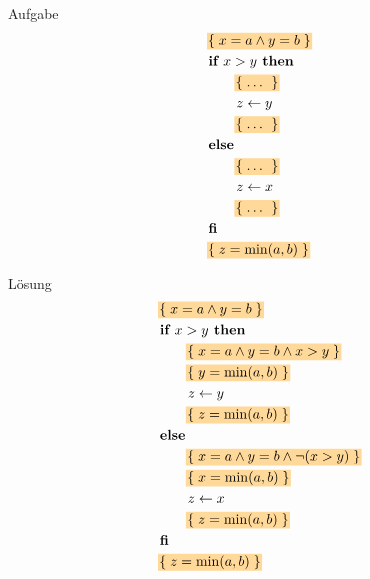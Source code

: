 \begin{frame}{Aufgabe}
	\vspace{-10mm}
	  \begin{align*}
	&\assert{x=a \land y=b}  \\
	&\kw{if } x>y \kw{ then } \\
	&\hspace{2em} \assert{ \dots\ } \\
	&\hspace{2em}  z \gets y  \\
	&\hspace{2em} \assert{ \dots\ } \\
	&\kw{else } \\
	&\hspace{2em} \assert{ \dots\ } \\
	&\hspace{2em}  z \gets x  \\
	&\hspace{2em} \assert{ \dots\ } \\
	&\kw{fi } \\
	&\assert{z=\min(a,b)}
	\end{align*}
\end{frame}

\begin{frame}{Lösung}	
	\vspace{-2.5\baselineskip}
	\begin{alignat*}{2}
	&\assert{x=a \land y=b}  \\
	&\kw{if } x>y \kw{ then } \\
	&\hspace{2em} \assert{x=a \land y=b \land x>y} \\
	&\hspace{2em} \assert{y=\min(a,b)} \\
	&\hspace{2em}  z \gets y  \\
	&\hspace{2em} \assert{z=\min(a,b)} \\
	&\kw{else } \\
	&\hspace{2em} \assert{x=a \land y=b \land  \lnot (x>y)} \\
	&\hspace{2em} \assert{x=\min(a,b)} \\
	&\hspace{2em}  z \gets x  \\
	&\hspace{2em} \assert{z=\min(a,b)} \\
	&\kw{fi } \\
	&\assert{z=\min(a,b)}
	\end{alignat*}
\end{frame}


